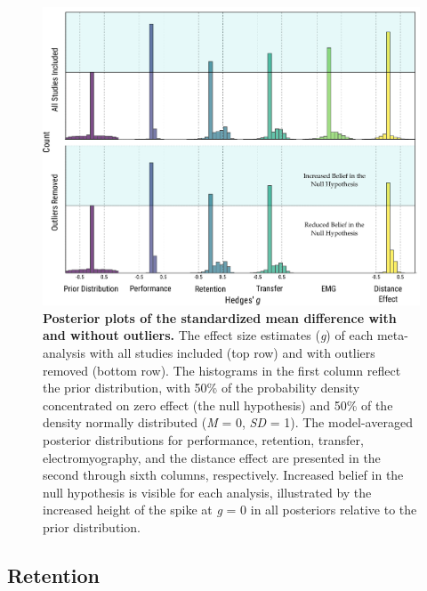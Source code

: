 \documentclass[
  man, donotrepeattitle,floatsintext]{apa7}
\begin{document}
\begin{figure}

{\centering \includegraphics{../../figs/fig1} 

}

\caption{\linespread{1.15}\selectfont \small \normalfont \textbf{Posterior plots of the standardized mean difference with and without outliers.} The effect size estimates (\emph{g}) of each meta-analysis with all studies included (top row) and with outliers removed (bottom row). The histograms in the first column reflect the prior distribution, with 50\% of the probability density concentrated on zero effect (the null hypothesis) and 50\% of the density normally distributed (\emph{M} = 0, \emph{SD} = 1). The model-averaged posterior distributions for performance, retention, transfer, electromyography, and the distance effect are presented in the second through sixth columns, respectively. Increased belief in the null hypothesis is visible for each analysis, illustrated by the increased height of the spike at \emph{g} = 0 in all posteriors relative to the prior distribution.}\label{fig:fig1}
\end{figure}



\clearpage

\hypertarget{retention}{%
\subsection{Retention}\label{retention}}
\end{document}
